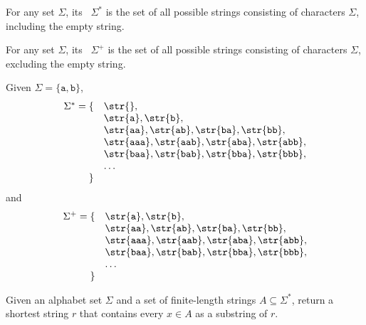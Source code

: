 \begin{flex}
\label{grp:def:genome::kleene-operators}

\begin{definition}
\label{def:genome::kleene-operators}
For any set $\Sigma$, its~ $\Sigma^*$ is the set of
all possible strings consisting of characters $\Sigma$, including the
empty string.

For any set $\Sigma$, its~ $\Sigma^+$ is the set of
all possible strings consisting of characters $\Sigma$, excluding the
empty string.

\end{definition}

\begin{example}
\label{xmpl:genome::given}
Given $\Sigma = \{\texttt{a},\texttt{b}\}$,
\[
\begin{array}{rl}
\Sigma^* 
= 
\{
&
\str{}, 
\\
&
\str{\texttt{a}}, \str{\texttt{b}}, 
\\
&
\str{\texttt{aa}}, \str{\texttt{ab}}, 
\str{\texttt{ba}}, \str{\texttt{bb}}, 
\\
&
\str{\texttt{aaa}}, \str{\texttt{aab}}, \str{\texttt{aba}},
\str{\texttt{abb}},
\\
& \str{\texttt{baa}}, \str{\texttt{bab}}, \str{\texttt{bba}}, \str{\texttt{bbb}},
\\
&
\ldots
\\
\} &
\end{array}
\]
and
\[
\begin{array}{rl}
\Sigma^+
= 
\{
&
\str{\texttt{a}}, \str{\texttt{b}}, 
\\
&
\str{\texttt{aa}}, \str{\texttt{ab}}, 
\str{\texttt{ba}}, \str{\texttt{bb}}, 
\\
&
\str{\texttt{aaa}}, \str{\texttt{aab}}, \str{\texttt{aba}}, \str{\texttt{abb}}, 
\\
&
\str{\texttt{baa}}, \str{\texttt{bab}}, \str{\texttt{bba}}, 
\str{\texttt{bbb}},
\\
& \ldots
\\
\} & 
\\
\end{array}
\]

\end{example}
\end{flex}

\begin{cluster}
\label{grp:def:genome::shortest-superstring-ss-problem}

\begin{definition}
\label{def:genome::shortest-superstring-ss-problem}
  Given an alphabet set $\Sigma$ and a set of finite-length strings
  $A \subseteq \Sigma^*$, return a shortest string $r$ that contains every $x
  \in A$ as a substring of $r$.

\end{definition}
\end{cluster}

